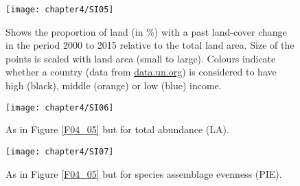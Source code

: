 \begin{figure}[htb]
\centering
\texttt{[image: chapter4/SI05]}
\caption{ Shows the proportion of land (in \%) with a past land-cover change in the period 2000 to 2015 relative to the total land area. Size of the points is scaled with land area (small to large). Colours indicate whether a country (data from \href{data.un.org}{data.un.org}) is considered to have high (black), middle (orange) or low (blue) income.}
\label{SI04_05}
\end{figure}

\begin{figure}[htb]
\centering
\texttt{[image: chapter4/SI06]}
\caption{ As in Figure \ref{F04_05} but for total abundance (LA). }
\label{SI04_06}
\end{figure}

\begin{figure}[htb]
\centering
\texttt{[image: chapter4/SI07]}
\caption{As in Figure \ref{F04_05} but for species assemblage evenness (PIE). }
\label{SI04_07}
\end{figure}
